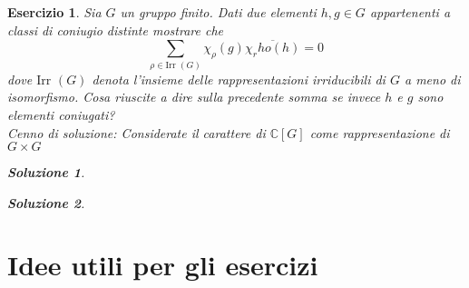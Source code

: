 \documentclass[a4paper]{article}
\theoremstyle{break}
\newtheorem{ex}{{ \Large Esercizio} }
\theoremstyle{plain}
\newtheorem{sol}{Soluzione}[ex]
\newcommand{\bbC}{\mathbb{C}}
\newcommand{\Irr}{\text{Irr }}
\begin{document}
\begin{ex}
Sia $G$ un gruppo finito. Dati due elementi $h, g \in G$ appartenenti a classi di coniugio distinte mostrare che $$ \sum_{\rho \in \Irr(G)} \chi_\rho(g) \overline{\chi_rho(h)} = 0 $$
dove $\Irr(G)$ denota l'insieme delle rappresentazioni irriducibili di $G$ a meno di isomorfismo. Cosa riuscite a dire sulla precedente somma se invece $h$ e $g$ sono elementi coniugati? \\
Cenno di soluzione: Considerate il carattere di $\bbC[G]$ come rappresentazione di $G \times G$

\begin{sol}

\end{sol}

\begin{sol}

\end{sol}


\end{ex}

\newpage
\section*{Idee utili per gli esercizi}
\end{document}
